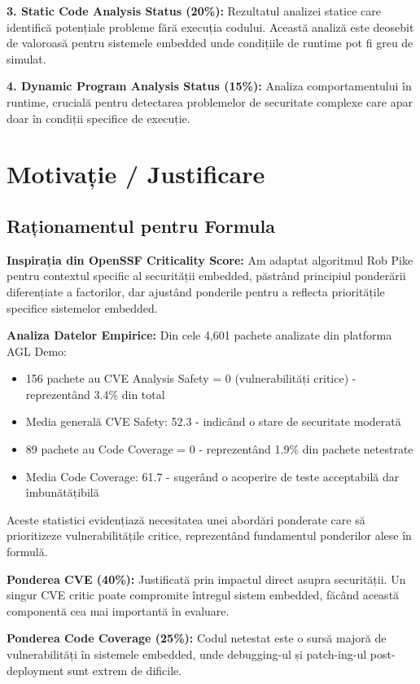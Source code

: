 \documentclass[12pt,a4paper]{article}
\begin{document}
\textbf{3. Static Code Analysis Status (20\%):} Rezultatul analizei statice care identifică potențiale probleme fără execuția codului. Această analiză este deosebit de valoroasă pentru sistemele embedded unde condițiile de runtime pot fi greu de simulat.

\textbf{4. Dynamic Program Analysis Status (15\%):} Analiza comportamentului în runtime, crucială pentru detectarea problemelor de securitate complexe care apar doar în condiții specifice de execuție.

\section{Motivație / Justificare}

\subsection{Raționamentul pentru Formula}

\textbf{Inspirația din OpenSSF Criticality Score:} Am adaptat algoritmul Rob Pike pentru contextul specific al securității embedded, păstrând principiul ponderării diferențiate a factorilor, dar ajustând ponderile pentru a reflecta prioritățile specifice sistemelor embedded.

\textbf{Analiza Datelor Empirice:} Din cele 4,601 pachete analizate din platforma AGL Demo:

\begin{itemize}
\item 156 pachete au CVE Analysis Safety = 0 (vulnerabilități critice) - reprezentând 3.4\% din total
\item Media generală CVE Safety: 52.3 - indicând o stare de securitate moderată
\item 89 pachete au Code Coverage = 0 - reprezentând 1.9\% din pachete netestrate
\item Media Code Coverage: 61.7 - sugerând o acoperire de teste acceptabilă dar îmbunătățibilă
\end{itemize}

Aceste statistici evidențiază necesitatea unei abordări ponderate care să prioritizeze vulnerabilitățile critice, reprezentând fundamentul ponderilor alese în formulă.

\textbf{Ponderea CVE (40\%):} Justificată prin impactul direct asupra securității. Un singur CVE critic poate compromite întregul sistem embedded, făcând această componentă cea mai importantă în evaluare.

\textbf{Ponderea Code Coverage (25\%):} Codul netestat este o sursă majoră de vulnerabilități în sistemele embedded, unde debugging-ul și patch-ing-ul post-deployment sunt extrem de dificile.
\end{document}
